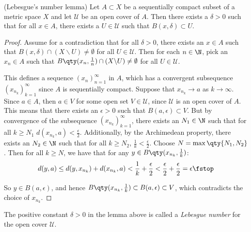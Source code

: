  \begin{lemma}
   (Lebesgue's number lemma) Let \( A\subset X \) be a sequentially compact subset of a metric space \( X \) and let \( \mathcal{U} \) be an open cover of \( A \). Then there exists a \( \delta>0 \) such that for all \( x\in A \), there exists a \( U\in\mathcal{U} \) such that \( B(x,\delta)\subset U \).
 \end{lemma}
 \begin{proof}
   Assume for a contradiction that for all \( \delta>0 \), there exists an \( x\in A \) such that \( B(x,\delta)\cap (X\backslash U)\neq\emptyset \) for all \( U\in\mathcal{U} \). Then for each \( n\in\N \), pick an \( x_n\in A \) such that \( B\qty(x_n,\frac{1}{n})\cap (X\backslash U)\neq\emptyset \) for all \( U\in\mathcal{U} \).

   \vspace{3mm}

   This defines a sequence \( (x_n)_{n=1}^\infty \) in \( A \), which has a convergent subsequence \( (x_{n_k})_{k=1}^\infty \) since \( A \) is sequentially compact. Suppose that \( x_{n_k}\to a \) as \( k\to\infty \). Since \( a\in A \), then \( a\in V \) for some open set \( V\in\mathcal{U} \), since \( \mathcal{U} \) is an open cover of \( A \). This means that there exists an \( \epsilon>0 \) such that \( B(a,\epsilon)\subset V \). But by convergence of the subsequence \( (x_{n_k})_{k=1}^\infty \), there exists an \( N_1\in\N \) such that for all \( k\geq N_1 \) \( d(x_{n_k},a)<\frac{\epsilon}{2} \). Additionally, by the Archimedean property, there exists an \( N_2\in\N \) such that for all \( k\geq N_2 \), \( \frac{1}{k}<\frac{\epsilon}{2} \). Choose \( N=\max\qty{N_1,N_2} \). Then for all \( k\geq N \), we have that for any \( y\in B\qty(x_{n_k},\frac{1}{k}) \):
   \[ d(y,a)\leq d(y,x_{n_k})+d(x_{n_k},a)<\frac{1}{k}+\frac{\epsilon}{2}<\frac{\epsilon}{2}+\frac{\epsilon}{2}=\epsilon\fstop \]

   So \( y\in B(a,\epsilon) \), and hence \( B\qty(x_{n_k},\frac{1}{k})\subset B(a,\epsilon)\subset V \), which contradicts the choice of \( x_{n_k} \).
 \end{proof}
 The positive constant \( \delta>0 \) in the lemma above is called a \emph{Lebesgue number} for the open cover \( \mathcal{U} \).

